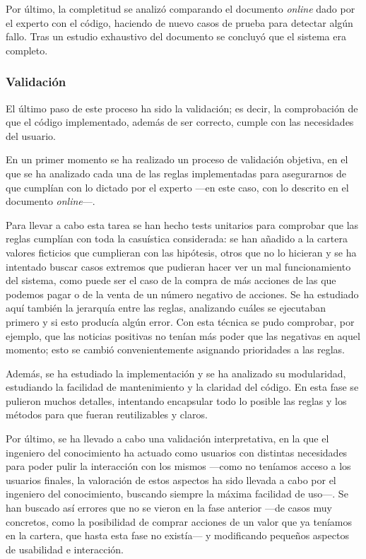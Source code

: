 \documentclass[a4paper, 11pt, titlepage]{article}
\begin{document}
    Por último, la completitud se analizó comparando el documento \emph{online} dado por el experto con el código, haciendo de nuevo casos de prueba para detectar algún fallo. Tras un estudio exhaustivo del documento se concluyó que el sistema era completo.

    \subsubsection*{Validación}
    El último paso de este proceso ha sido la validación; es decir, la comprobación de que el código implementado, además de ser correcto, cumple con las necesidades del usuario.

    En un primer momento se ha realizado un proceso de validación objetiva, en el que se ha analizado cada una de las reglas implementadas para asegurarnos de que cumplían con lo dictado por el experto ---en este caso, con lo descrito en el documento \emph{online}---.

    Para llevar a cabo esta tarea se han hecho tests unitarios para comprobar que las reglas cumplían con toda la casuística considerada: se han añadido a la cartera valores ficticios que cumplieran con las hipótesis, otros que no lo hicieran y se ha intentado buscar casos extremos que pudieran hacer ver un mal funcionamiento del sistema, como puede ser el caso de la compra de más acciones de las que podemos pagar o de la venta de un número negativo de acciones. Se ha estudiado aquí también la jerarquía entre las reglas, analizando cuáles se ejecutaban primero y si esto producía algún error. Con esta técnica se pudo comprobar, por ejemplo, que las noticias positivas no tenían más poder que las negativas en aquel momento; esto se cambió convenientemente asignando prioridades a las reglas.

    Además, se ha estudiado la implementación y se ha analizado su modularidad, estudiando la facilidad de mantenimiento y la claridad del código. En esta fase se pulieron muchos detalles, intentando encapsular todo lo posible las reglas y los métodos para que fueran reutilizables y claros.

    Por último, se ha llevado a cabo una validación interpretativa, en la que el ingeniero del conocimiento ha actuado como usuarios con distintas necesidades para poder pulir la interacción con los mismos ---como no teníamos acceso a los usuarios finales, la valoración de estos aspectos ha sido llevada a cabo por el ingeniero del conocimiento, buscando siempre la máxima facilidad de uso---. Se han buscado así errores que no se vieron en la fase anterior ---de casos muy concretos, como la posibilidad de comprar acciones de un valor que ya teníamos en la cartera, que hasta esta fase no existía--- y modificando pequeños aspectos de usabilidad e interacción.
\end{document}
